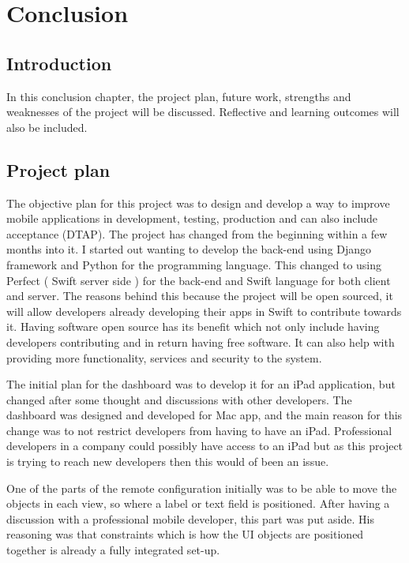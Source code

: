 \chapter{Conclusion}

\label{ch:conclusions}

\section{Introduction}

In this conclusion chapter, the project plan, future work, strengths and weaknesses of the project will be discussed. Reflective and learning outcomes will also be included.

\section{Project plan}

The objective plan for this project was to design and develop a way to improve mobile applications in development, testing, production and can also include acceptance (DTAP). The project has changed from the beginning within a few months into it. I started out wanting to develop the back-end using Django framework and Python for the programming language. This changed to using Perfect ( Swift server side ) for the back-end and Swift language for both client and server. The reasons behind this because the project will be open sourced, it will allow developers already developing their apps in Swift to contribute towards it. Having software open source has its benefit which not only include having developers contributing and in return having free software. It can also help with providing more functionality, services and security to the system.

The initial plan for the dashboard was to develop it for an iPad application, but changed after some thought and discussions with other developers. The dashboard was designed and developed for Mac app, and the main reason for this change was to not restrict developers from having to have an iPad. Professional developers in a company could possibly have access to an iPad but as this project is trying to reach new developers then this would of been an issue.

One of the parts of the remote configuration initially was to be able to move the objects in each view, so where a label or text field is positioned. After having a discussion with a professional mobile developer, this part was put aside. His reasoning was that constraints which is how the UI objects are positioned together is already a fully integrated set-up.

